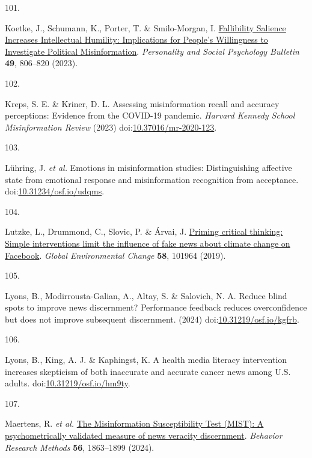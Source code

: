 \documentclass[
  man]{apa6}
\newlength{\cslhangindent}
\newlength{\csllabelwidth}
\newenvironment{CSLReferences}[2] %
 {\begin{list}{}{%
  \setlength{\itemindent}{0pt}
  \setlength{\leftmargin}{0pt}
  \setlength{\parsep}{0pt}
  \ifodd #1
   \setlength{\leftmargin}{\cslhangindent}
   \setlength{\itemindent}{-1\cslhangindent}
  \fi
  \setlength{\itemsep}{#2\baselineskip}}}
 {\end{list}}
\newcommand{\CSLLeftMargin}[1]{\parbox[t]{\csllabelwidth}{\strut#1\strut}}
\newcommand{\CSLRightInline}[1]{\parbox[t]{\linewidth - \csllabelwidth}{\strut#1\strut}}
\begin{document}
\begin{CSLReferences}{0}{0}
\CSLLeftMargin{101. }%
\CSLRightInline{*Koetke, J., Schumann, K., Porter, T. \& Smilo-Morgan, I. \href{https://doi.org/10.1177/01461672221080979}{Fallibility Salience Increases Intellectual Humility: Implications for People{'}s Willingness to Investigate Political Misinformation}. \emph{Personality and Social Psychology Bulletin} \textbf{49}, 806--820 (2023).}

\CSLLeftMargin{102. }%
\CSLRightInline{*Kreps, S. E. \& Kriner, D. L. Assessing misinformation recall and accuracy perceptions: Evidence from the COVID-19 pandemic. \emph{Harvard Kennedy School Misinformation Review} (2023) doi:\href{https://doi.org/10.37016/mr-2020-123}{10.37016/mr-2020-123}.}

\CSLLeftMargin{103. }%
\CSLRightInline{*Lühring, J. \emph{et al.} Emotions in misinformation studies: Distinguishing affective state from emotional response and misinformation recognition from acceptance. doi:\href{https://doi.org/10.31234/osf.io/udqms}{10.31234/osf.io/udqms}.}

\CSLLeftMargin{104. }%
\CSLRightInline{*Lutzke, L., Drummond, C., Slovic, P. \& Árvai, J. \href{https://doi.org/10.1016/j.gloenvcha.2019.101964}{Priming critical thinking: Simple interventions limit the influence of fake news about climate change on Facebook}. \emph{Global Environmental Change} \textbf{58}, 101964 (2019).}

\CSLLeftMargin{105. }%
\CSLRightInline{*Lyons, B., Modirrousta-Galian, A., Altay, S. \& Salovich, N. A. Reduce blind spots to improve news discernment? Performance feedback reduces overconfidence but does not improve subsequent discernment. (2024) doi:\href{https://doi.org/10.31219/osf.io/kgfrb}{10.31219/osf.io/kgfrb}.}

\CSLLeftMargin{106. }%
\CSLRightInline{*Lyons, B., King, A. J. \& Kaphingst, K. A health media literacy intervention increases skepticism of both inaccurate and accurate cancer news among U.S. adults. doi:\href{https://doi.org/10.31219/osf.io/hm9ty}{10.31219/osf.io/hm9ty}.}

\CSLLeftMargin{107. }%
\CSLRightInline{*Maertens, R. \emph{et al.} \href{https://doi.org/10.3758/s13428-023-02124-2}{The Misinformation Susceptibility Test (MIST): A psychometrically validated measure of news veracity discernment}. \emph{Behavior Research Methods} \textbf{56}, 1863--1899 (2024).}


\end{CSLReferences}
\end{document}
